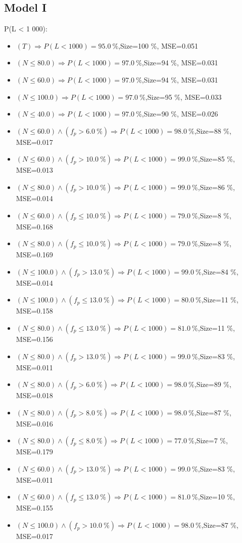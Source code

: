 \documentclass[numbered]{CSL}
\begin{document}
\subsection{Model I}
P(L < 1 000):
\begin{itemize}
\item $(T) \Rightarrow P(L < 1 000) = 95.0~\%$,\hfill Size=100 \%, MSE=0.051
\item $(N \leq 80.0) \Rightarrow P(L < 1 000) = 97.0~\%$,\hfill Size=94 \%, MSE=0.031
\item $(N \leq 60.0) \Rightarrow P(L < 1 000) = 97.0~\%$,\hfill Size=94 \%, MSE=0.031
\item $(N \leq 100.0) \Rightarrow P(L < 1 000) = 97.0~\%$,\hfill Size=95 \%, MSE=0.033
\item $(N \leq 40.0) \Rightarrow P(L < 1 000) = 97.0~\%$,\hfill Size=90 \%, MSE=0.026
\item $(N \leq 60.0) \land (f_p > 6.0~\%) \Rightarrow P(L < 1 000) = 98.0~\%$,\hfill Size=88 \%, MSE=0.017
\item $(N \leq 60.0) \land (f_p > 10.0~\%) \Rightarrow P(L < 1 000) = 99.0~\%$,\hfill Size=85 \%, MSE=0.013
\item $(N \leq 80.0) \land (f_p > 10.0~\%) \Rightarrow P(L < 1 000) = 99.0~\%$,\hfill Size=86 \%, MSE=0.014
\item $(N \leq 60.0) \land (f_p \leq 10.0~\%) \Rightarrow P(L < 1 000) = 79.0~\%$,\hfill Size=8 \%, MSE=0.168
\item $(N \leq 80.0) \land (f_p \leq 10.0~\%) \Rightarrow P(L < 1 000) = 79.0~\%$,\hfill Size=8 \%, MSE=0.169
\item $(N \leq 100.0) \land (f_p > 13.0~\%) \Rightarrow P(L < 1 000) = 99.0~\%$,\hfill Size=84 \%, MSE=0.014
\item $(N \leq 100.0) \land (f_p \leq 13.0~\%) \Rightarrow P(L < 1 000) = 80.0~\%$,\hfill Size=11 \%, MSE=0.158
\item $(N \leq 80.0) \land (f_p \leq 13.0~\%) \Rightarrow P(L < 1 000) = 81.0~\%$,\hfill Size=11 \%, MSE=0.156
\item $(N \leq 80.0) \land (f_p > 13.0~\%) \Rightarrow P(L < 1 000) = 99.0~\%$,\hfill Size=83 \%, MSE=0.011
\item $(N \leq 80.0) \land (f_p > 6.0~\%) \Rightarrow P(L < 1 000) = 98.0~\%$,\hfill Size=89 \%, MSE=0.018
\item $(N \leq 80.0) \land (f_p > 8.0~\%) \Rightarrow P(L < 1 000) = 98.0~\%$,\hfill Size=87 \%, MSE=0.016
\item $(N \leq 80.0) \land (f_p \leq 8.0~\%) \Rightarrow P(L < 1 000) = 77.0~\%$,\hfill Size=7 \%, MSE=0.179
\item $(N \leq 60.0) \land (f_p > 13.0~\%) \Rightarrow P(L < 1 000) = 99.0~\%$,\hfill Size=83 \%, MSE=0.011
\item $(N \leq 60.0) \land (f_p \leq 13.0~\%) \Rightarrow P(L < 1 000) = 81.0~\%$,\hfill Size=10 \%, MSE=0.155
\item $(N \leq 100.0) \land (f_p > 10.0~\%) \Rightarrow P(L < 1 000) = 98.0~\%$,\hfill Size=87 \%, MSE=0.017
\end{itemize}
\end{document}
